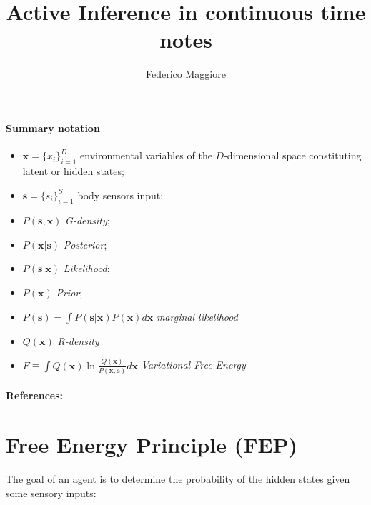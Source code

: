 \documentclass[a4paper, 10pt]{article}
\title{Active Inference in continuous time notes}
\author{Federico Maggiore}
\begin{document}

\maketitle

\paragraph{\textbf{Summary notation}}
\begin{itemize}

\item $\mathbf x = \lbrace{ x_i \rbrace}_{i=1}^{D}$ environmental variables of the $D$-dimensional space constituting latent or hidden states;

\item $\mathbf{s} = \lbrace{ s_i \rbrace}_{i=1}^{S}$ body sensors input;

\item $P(\mathbf{s},\mathbf{x})$ \emph{G-density};

\item $P(\mathbf{x}|\mathbf{s})$ \emph{Posterior}; 

\item $P(\mathbf{s}|\mathbf{x})$ \emph{Likelihood};

\item $P(\mathbf x)$ \emph{Prior};

\item $P(\mathbf s)=\int P(\mathbf s|\mathbf x)P(\mathbf x) d\mathbf x $ \emph{marginal likelihood}

\item $Q(\mathbf x)$ \emph{R-density}

\item $F \equiv \int Q(\mathbf x) \ln \frac{Q(\mathbf x)}{P(\mathbf x,\mathbf s)}d\mathbf x $ \emph{Variational Free Energy}

\end{itemize}

\paragraph{\textbf{References:}} 
\cite{Baltieri2019} \cite{Buckley2017}




\section*{Free Energy Principle (FEP)}
The goal of an agent is to determine the probability of the hidden states given some sensory inputs:
\end{document}
